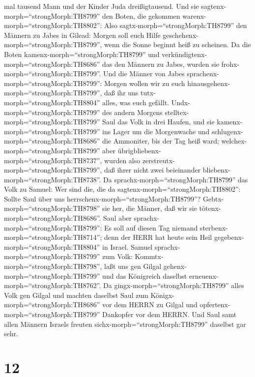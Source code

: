 mal tausend Mann und der Kinder Juda dreißigtausend.  Und
sie sagtenx-morph=``strongMorph:TH8799'' den Boten, die gekommen
warenx-morph=``strongMorph:TH8802'': Also
sagtx-morph=``strongMorph:TH8799'' den Männern zu Jabes in Gilead:
Morgen soll euch Hilfe geschehenx-morph=``strongMorph:TH8799'', wenn die
Sonne beginnt heiß zu scheinen. Da die Boten
kamenx-morph=``strongMorph:TH8799'' und
verkündigtenx-morph=``strongMorph:TH8686'' das den Männern zu Jabes,
wurden sie frohx-morph=``strongMorph:TH8799''.  Und die
Männer von Jabes sprachenx-morph=``strongMorph:TH8799'': Morgen wollen
wir zu euch hinausgehenx-morph=``strongMorph:TH8799'', daß ihr uns
tutx-morph=``strongMorph:TH8804'' alles, was euch gefällt. 
Undx-morph=``strongMorph:TH8799'' des andern Morgens
stelltex-morph=``strongMorph:TH8799'' Saul das Volk in drei Haufen, und
sie kamenx-morph=``strongMorph:TH8799'' ins Lager um die Morgenwache und
schlugenx-morph=``strongMorph:TH8686'' die Ammoniter, bis der Tag heiß
ward; welchex-morph=``strongMorph:TH8799'' aber
übrigbliebenx-morph=``strongMorph:TH8737'', wurden also
zerstreutx-morph=``strongMorph:TH8799'', daß ihrer nicht zwei
beieinander bliebenx-morph=``strongMorph:TH8738''.  Da
sprachx-morph=``strongMorph:TH8799'' das Volk zu Samuel: Wer sind die,
die da sagtenx-morph=``strongMorph:TH8802'': Sollte Saul über uns
herrschenx-morph=``strongMorph:TH8799''?
Gebtx-morph=``strongMorph:TH8798'' sie her, die Männer, daß wir sie
tötenx-morph=``strongMorph:TH8686''.  Saul aber
sprachx-morph=``strongMorph:TH8799'': Es soll auf diesen Tag niemand
sterbenx-morph=``strongMorph:TH8714''; denn der HERR hat heute sein Heil
gegebenx-morph=``strongMorph:TH8804'' in Israel.  Samuel
sprachx-morph=``strongMorph:TH8799'' zum Volk:
Kommtx-morph=``strongMorph:TH8798'', laßt uns gen Gilgal
gehenx-morph=``strongMorph:TH8799'' und das Königreich daselbst
erneuenx-morph=``strongMorph:TH8762''.  Da
gingx-morph=``strongMorph:TH8799'' alles Volk gen Gilgal und machten
daselbst Saul zum Königx-morph=``strongMorph:TH8686'' vor dem HERRN zu
Gilgal und opfertenx-morph=``strongMorph:TH8799'' Dankopfer vor dem
HERRN. Und Saul samt allen Männern Israels freuten
sichx-morph=``strongMorph:TH8799'' daselbst gar sehr.

\hypertarget{section-11}{%
\section{12}\label{section-11}}

